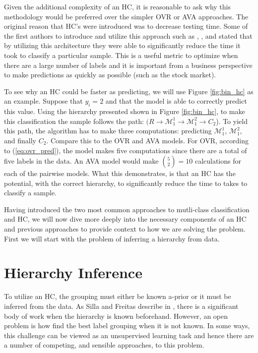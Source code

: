 \documentclass[../thesis.tex]{subfiles}
\begin{document}
Given the additional complexity of an HC, it is reasonable to ask why this
methodology would be preferred over the simpler OVR or AVA approaches. The
original reason that HC's were introduced was to decrease testing time. Some of
the first authors to introduce and utilize this approach such as
\cite{vural2004hierarchical}, \cite{bengio2010label}, and \cite{deng2011fast}
stated that by utilizing this architecture they were able to significantly
reduce the time it took to classify a particular sample. This is a useful metric
to optimize when there are a large number of labels and it is important from a
business perspective to make predictions as quickly as possible (such as the
stock market).

To see why an HC could be faster as predicting, we will use Figure
\ref{fig:bin_hc} as an example. Suppose that $y_i = 2$ and that the model is
able to correctly predict this value. Using the hierarchy presented shown in
Figure \ref{fig:bin_hc}, to make this classification the sample follows the
path: $(R \rightarrow \mathcal{M}_1^1 \rightarrow \mathcal{M}_1^2 \rightarrow
C_2$). To yield this path, the algorithm has to make three computations:
predicting $\mathcal{M}_1^1$, $\mathcal{M}_1^2$, and finally $C_2$. Compare this
to the OVR and AVA models. For OVR, according to (\ref{eq:ovr_pred}), the model
makes five computations since there are a total of five labels in the data. An
AVA model would make $\binom{5}{2} = 10$ calculations for each of the pairwise
models. What this demonstrates, is that an HC has the potential, with the
correct hierarchy, to significantly reduce the time to takes to classify a
sample.

Having introduced the two most common approaches to mutli-class classification
and HC, we will now dive more deeply into the necessary components of an HC and
previous approaches to provide context to how we are solving the problem. First
we will start with the problem of inferring a hierarchy from data.

\section{Hierarchy Inference}
To utilize an HC, the grouping must either be known a-prior or it must be
inferred from the data. As Silla and Freitas describe in \cite{silla2011survey},
there is a significant body of work when the hierarchy is known beforehand.
However, an open problem is how find the best label grouping when it is not
known. In some ways, this challenge can be viewed as an unsupervised learning
task and hence there are a number of competing, and sensible approaches, to this
problem.
\end{document}
